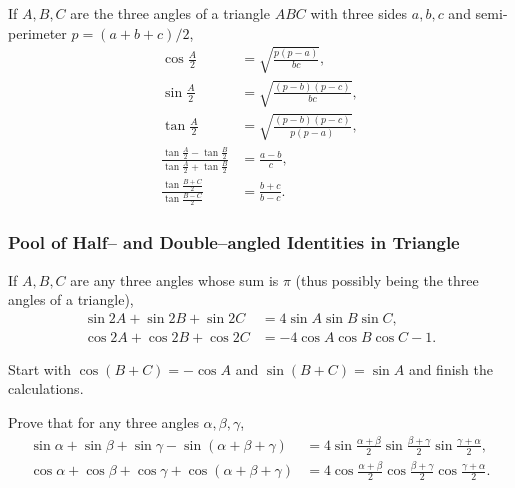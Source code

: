     \begin{question}
        If $A, B, C$ are the three angles of a triangle $ABC$ with three sides $a,b,c$ and semi-perimeter $p=(a+b+c)/2$,
        \begin{align}
            \cos \frac{A}{2} &= \sqrt{\frac{p(p-a)}{bc}},\\
            \sin \frac{A}{2} &= \sqrt{\frac{(p-b)(p-c)}{bc}},\\
            \tan \frac{A}{2} &= \sqrt{\frac{(p-b)(p-c)}{p(p-a)}},\\
            \frac{\tan \frac{A}{2}-\tan \frac{B}{2}}{\tan \frac{A}{2}+\tan \frac{B}{2}} &= \frac{a-b}{c},\\
            \frac{\tan \frac{B+C}{2}}{\tan \frac{B-C}{2}} &= \frac{b+c}{b-c}.
        \end{align}
    \end{question}

\subsubsection{Pool of Half-- and Double--angled Identities in Triangle}
\begin{question}
    \label{q:sin2A+sin2B+sin2C}
        If $A, B, C$ are any three angles whose sum is $\pi$ (thus possibly being the three angles of a triangle),
        \begin{align}
            \sin 2A + \sin 2B + \sin 2C &= 4 \sin A \sin B \sin C,\\
            \cos 2A + \cos 2B + \cos 2C &=-4\cos A \cos B \cos C - 1.
        \end{align}
\end{question}
\begin{solution}
    Start with $\cos(B+C)=-\cos A$ and $\sin(B+C)=\sin A$ and finish the calculations.
\end{solution}

\begin{question}
    Prove that for any three angles $\alpha,\beta,\gamma$,
    \begin{align*}
        \sin \alpha + \sin \beta + \sin \gamma - \sin(\alpha+\beta+\gamma) &= 4\sin\frac{\alpha+\beta}{2}\sin\frac{\beta+\gamma}{2}\sin\frac{\gamma+\alpha}{2},\\
        \cos \alpha + \cos \beta + \cos \gamma + \cos(\alpha+\beta+\gamma) &= 4\cos\frac{\alpha+\beta}{2}\cos\frac{\beta+\gamma}{2}\cos\frac{\gamma+\alpha}{2}.
    \end{align*}
\end{question}



